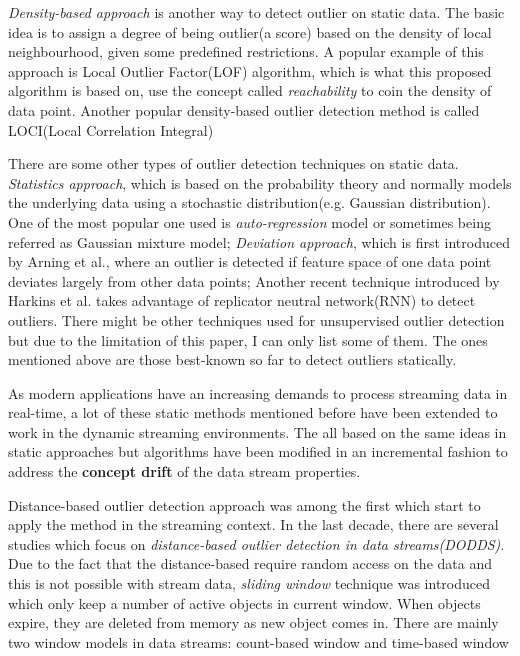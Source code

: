 \documentclass[11pt]{article}       %
\begin{document}
\textit{Density-based approach} is another way to detect outlier on static data. The basic idea is to assign a degree of being outlier(a score) based on the density of local neighbourhood, given some predefined restrictions. A popular example of this approach is Local Outlier Factor(LOF) algorithm\cite{Breunig:2000:LID:342009.335388}, which is what this proposed algorithm is based on, use the concept called \textit{reachability} to coin the density of data point. Another popular density-based outlier detection method is called LOCI(Local Correlation Integral)\cite{1260802}

There are some other types of outlier detection techniques on static data. \textit{Statistics approach}, which is based on the probability theory and normally models the underlying data using a stochastic distribution(e.g. Gaussian distribution). One of the most popular one used is \textit{auto-regression} model or sometimes being referred as Gaussian mixture model\cite{4438332}; \textit{Deviation approach}, which is first introduced by Arning et al.\cite{A.Arning:deviation}, where an outlier is detected if feature space of one data point deviates largely from other data points; Another recent technique introduced by Harkins et al.\cite{S.Harkins:rnn} takes advantage of replicator neutral network(RNN) to detect outliers. There might be other techniques used for unsupervised outlier detection but due to the limitation of this paper, I can only list some of them. The ones mentioned above are those best-known so far to detect outliers statically.


As modern applications have an increasing demands to process streaming data in real-time, a lot of these static methods mentioned before have been extended to work in the dynamic streaming environments. The all based on the same ideas in static approaches but algorithms have been modified in an incremental fashion to address the \textbf{concept drift} of the data stream properties.

Distance-based outlier detection approach was among the first which start to apply the method in the streaming context. In the last decade, there are several studies which focus on \textit{distance-based outlier detection in data streams(DODDS)}. Due to the fact that the distance-based require random access on the data and this is not possible with stream data, \textit{sliding window} technique was introduced which only keep a number of active objects in current window. When objects expire, they are deleted from memory as new object comes in. There are mainly two window models in data streams: count-based window and time-based window
\end{document}
